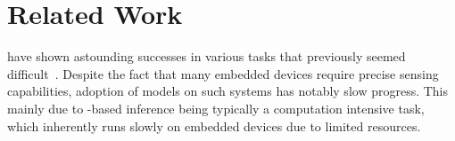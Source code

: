 \section{Related Work}
\DNNs have shown astounding successes in various tasks that previously seemed difficult~\cite{cho2014learning}. Despite the fact that many embedded
devices require precise sensing capabilities, adoption of \DNN models on such systems has notably slow progress. This mainly due to
\DNN-based inference being typically a computation intensive task, which inherently runs slowly on embedded devices due to limited
resources.

%


